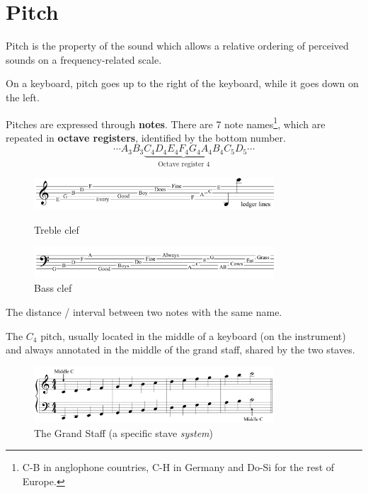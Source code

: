 \section{Pitch}
\begin{definition}[Pitch]
    Pitch is the property of the sound which allows a relative ordering of perceived sounds on a frequency-related scale.
\end{definition}
On a keyboard, pitch goes up to the right of the keyboard, while it goes down on the left.

Pitches are expressed through \textbf{notes}. There are 7 note names\footnote{C-B in anglophone countries, C-H in Germany and Do-Si for the rest of Europe.}, which are repeated in \textbf{octave registers}, identified by the bottom number.
$$\cdots A_3 B_3 \underbrace{C_4 D_4 E_4 F_4 G_4 A_4 B_4}_{\text{Octave register 4}} C_5 D_5 \cdots$$

\begin{figure}[h]
    \begin{center}
        \includegraphics[width=0.8\textwidth]{img/treble}
        \caption{Treble clef}
        \includegraphics[width=0.8\textwidth]{img/bass}
        \caption{Bass clef}
    \end{center}
\end{figure}

\begin{definition}[Octave]
    The distance / interval between two notes with the same name.
\end{definition}

\begin{definition}[Middle C]
    The $C_4$ pitch, usually located in the middle of a keyboard (on the instrument) and always annotated in the middle of the grand staff, shared by the two staves.
\end{definition}

\begin{figure}[t]
    \begin{center}
        \includegraphics[width=0.8\textwidth]{img/grandstaff}
        \caption{The Grand Staff (a specific stave \emph{system})}
    \end{center}
\end{figure}

